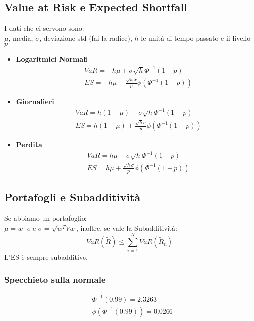 \documentclass[a4paper,notitlepage]{report}%
\begin{document}
\begin{multicols*}{2}
\section*{Value at Risk e Expected Shortfall}
    I dati che ci servono sono: \\
    $\mu$, media, $\sigma$, deviazione std (fai la radice),
    $h$ le unità di tempo passato e il livello $p$
    \begin{itemize}
        \item \textbf{Logaritmici Normali} 
            \begin{align*}
                &VaR = -h\mu+\sigma\sqrt{h}\Phi^{-1}(1-p) \\
                &ES = -h\mu+\frac{\sqrt{h}\sigma}{p} \phi(\Phi^{-1}(1-p))
            \end{align*}
        \item \textbf{Giornalieri}
            \begin{align*}
                &VaR = h(1-\mu)+\sigma\sqrt{h}\Phi^{-1}(1-p) \\
                &ES = h(1-\mu)+\frac{\sqrt{h}\sigma}{p} \phi(\Phi^{-1}(1-p))
            \end{align*}
        \item \textbf{Perdita}
            \begin{align*}
                &VaR = h\mu+\sigma\sqrt{h}\Phi^{-1}(1-p) \\
                &ES = h\mu+\frac{\sqrt{h}\sigma}{p} \phi(\Phi^{-1}(1-p))
            \end{align*}
    \end{itemize}

    \subsection*{Portafogli e Subadditività}
    Se abbiamo un portafoglio:\\
    $\mu = w\cdot e$ e $\sigma = \sqrt{w^TVw}$, inoltre, se vale
    la Subadditività:
    \[
        VaR(\tilde{R}) \leq \sum_{i=1}^N VaR(\tilde{R}_n)  
    \]
    L'ES è sempre subadditivo.

    \subsubsection*{Specchieto sulla normale}
    \begin{align*}
        & \Phi^{-1}(0.99) = 2.3263\\
        & \phi(\Phi^{-1}(0.99)) = 0.0266
    \end{align*}

    
\end{multicols*}
\end{document}
